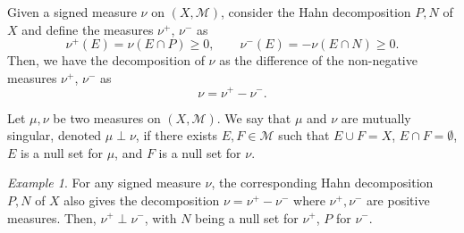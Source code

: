 \documentclass[11pt]{article}
\newcommand{\M}{\mathcal{M}}
\theoremstyle{definition}
\theoremstyle{remark}
\newtheorem*{example}{Example}
\begin{document}
    \begin{corollary}
        Given a signed measure $\nu$ on $(X, \M)$, consider the Hahn decomposition
        $P, N$ of $X$ and define the measures $\nu^+$, $\nu^-$ as \[
            \nu^+(E) = \nu(E \cap P) \geq 0, \qquad
            \nu^-(E) = -\nu(E \cap N) \geq 0.
        \] Then, we have the decomposition of $\nu$ as the difference of the non-negative
        measures $\nu^+$, $\nu^-$ as \[
            \nu = \nu^+ - \nu^-.
        \]
    \end{corollary}

    \begin{definition}
        Let $\mu, \nu$ be two measures on $(X, \M)$. We say that $\mu$ and $\nu$ are
        mutually singular, denoted $\mu \perp \nu$, if there exists $E, F \in \M$
        such that $E \cup F = X$, $E \cap F = \emptyset$, $E$ is a null set for
        $\mu$, and $F$ is a null set for $\nu$.
    \end{definition}
    \begin{example}
        For any signed measure $\nu$, the corresponding Hahn decomposition $P, N$ of
        $X$ also gives the decomposition $\nu = \nu^+ - \nu^-$ where $\nu^+, \nu^-$
        are positive measures. Then, $\nu^+ \perp \nu^-$, with $N$ being a null set
        for $\nu^+$, $P$ for $\nu^-$.
    \end{example}
\end{document}
